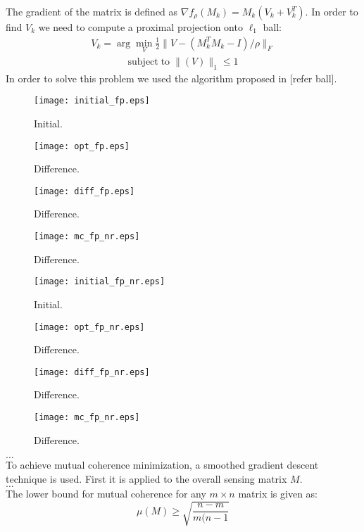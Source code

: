 \documentclass[journal]{IEEEtran}
\begin{document}
The gradient of the matrix is defined as $ \nabla f_{\rho} (M_k)=M_k(V_k+V_k^T)$. In order to find $V_k$ we need to compute a proximal projection onto $\ell_1$ ball:
\begin{align}
V_k=\arg\min_{V}\frac{1}{2}\| V-(M_k^TM_k-I)/\rho  \|_F
\end{align}
\begin{align}
\textrm{subject}\;\textrm{to} \;\|(V)\|_1\leq1
\end{align}
In order to solve this problem we used the algorithm proposed in [refer ball].
\begin{figure}[!h]
\centering
\texttt{[image: initial\_fp.eps]}
\caption{Initial.}
\label{Fig:initial_rand}
\end{figure}

\begin{figure}[!h]
\centering
\texttt{[image: opt\_fp.eps]}
\caption{Difference.}
\label{Fig:diff_rand}
\end{figure}

\begin{figure}[!h]
\centering
\texttt{[image: diff\_fp.eps]}
\caption{Difference.}
\label{Fig:diff_rand}
\end{figure}

\begin{figure}[!h]
\centering
\texttt{[image: mc\_fp\_nr.eps]}
\caption{Difference.}
\label{Fig:diff_rand}
\end{figure}

\begin{figure}[!h]
\centering
\texttt{[image: initial\_fp\_nr.eps]}
\caption{Initial.}
\label{Fig:initial_rand}
\end{figure}

\begin{figure}[!h]
\centering
\texttt{[image: opt\_fp\_nr.eps]}
\caption{Difference.}
\label{Fig:diff_rand}
\end{figure}

\begin{figure}[!h]
\centering
\texttt{[image: diff\_fp\_nr.eps]}
\caption{Difference.}
\label{Fig:diff_rand}
\end{figure}

\begin{figure}[!h]
\centering
\texttt{[image: mc\_fp\_nr.eps]}
\caption{Difference.}
\label{Fig:diff_rand}
\end{figure}

$\hdots$\\
To achieve mutual coherence minimization, a smoothed gradient descent technique is used.
First it is applied to the overall sensing matrix $M$. \\
$\hdots$\\
The lower bound for mutual coherence for any $m\times n$ matrix is given as:
\begin{equation}
\mu(M) \geq \sqrt{\frac{n - m}{m(n-1}}
\end{equation}
\end{document}
